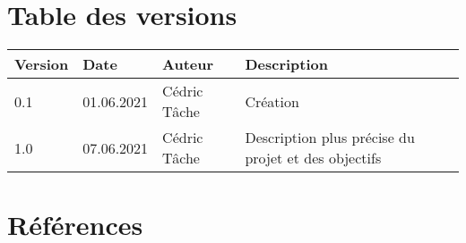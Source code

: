\documentclass[french,11pt]{article}
\begin{document}


\section *{Table des versions}
\vspace*{0.5 cm}

\begin{table}[h]
    \begin{tabularx}{\columnwidth}{ | p{1.5cm} | p{1.7cm} | p{2.5cm} | X |}
        \hline
        \textbf{Version} & \textbf{Date} & \textbf{Auteur} & \textbf{Description} \\
        \hline
        0.1 & 01.06.2021 & Cédric Tâche & Création \\
        1.0 & 07.06.2021 & Cédric Tâche & Description plus précise du projet et des objectifs \\
        \hline
    \end{tabularx}
\end{table}


\newpage

\hypersetup{
	hidelinks,
	allcolors=black,
	linktocpage,
	linktoc=all
}

\tableofcontents

\newpage




\section{Références}

\renewcommand{\bibsection}{}

\end{document}
